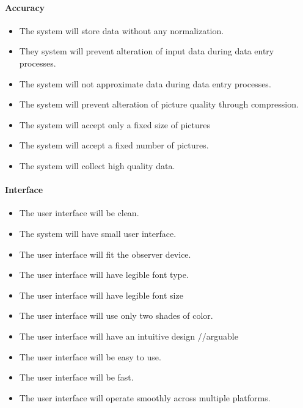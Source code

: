 \begin{itemize}
	\end{itemize}
    \paragraph{Accuracy}
        \begin{itemize}
            \item The system will store data without any normalization.
            \item They system will prevent alteration of input data during data entry processes.
            \item The system will not approximate data during data entry processes.
            \item The system will prevent alteration of picture quality through compression.
            \item The system will accept only a fixed size of pictures
            \item The system will accept a fixed number of pictures.
            \item The system will collect high quality data.

        \end{itemize}
    \paragraph{Interface}
        \begin{itemize}
            \item The user interface will be clean.
            \item The system will have small user interface.
            \item The user interface will fit the observer device.
            \item The user interface will have legible font type.
            \item The user interface will have legible font size
            \item The user interface will use only two shades of color.
            \item The user interface will have an intuitive design //arguable
            \item The user interface will be easy to use.
            \item The user interface will be fast.
            \item The user interface will operate smoothly across multiple platforms.

        \end{itemize}
